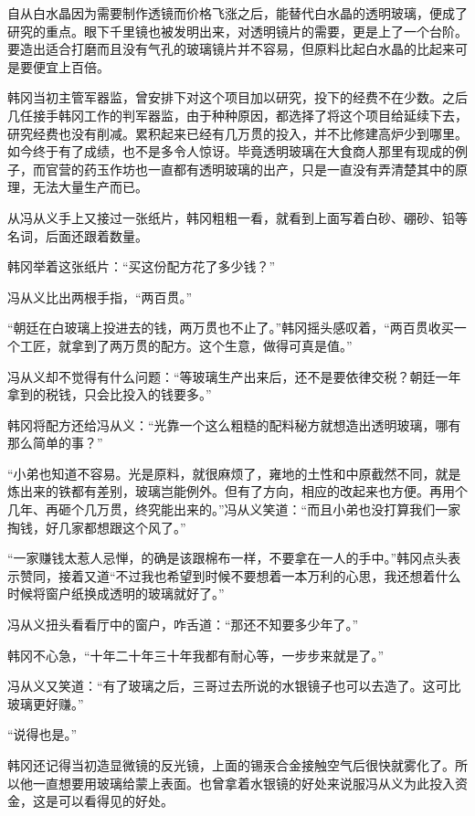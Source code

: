 自从白水晶因为需要制作透镜而价格飞涨之后，能替代白水晶的透明玻璃，便成了研究的重点。眼下千里镜也被发明出来，对透明镜片的需要，更是上了一个台阶。要造出适合打磨而且没有气孔的玻璃镜片并不容易，但原料比起白水晶的比起来可是要便宜上百倍。

韩冈当初主管军器监，曾安排下对这个项目加以研究，投下的经费不在少数。之后几任接手韩冈工作的判军器监，由于种种原因，都选择了将这个项目给延续下去，研究经费也没有削减。累积起来已经有几万贯的投入，并不比修建高炉少到哪里。如今终于有了成绩，也不是多令人惊讶。毕竟透明玻璃在大食商人那里有现成的例子，而官营的药玉作坊也一直都有透明玻璃的出产，只是一直没有弄清楚其中的原理，无法大量生产而已。

从冯从义手上又接过一张纸片，韩冈粗粗一看，就看到上面写着白砂、硼砂、铅等名词，后面还跟着数量。

韩冈举着这张纸片：“买这份配方花了多少钱？”

冯从义比出两根手指，“两百贯。”

“朝廷在白玻璃上投进去的钱，两万贯也不止了。”韩冈摇头感叹着，“两百贯收买一个工匠，就拿到了两万贯的配方。这个生意，做得可真是值。”

冯从义却不觉得有什么问题：“等玻璃生产出来后，还不是要依律交税？朝廷一年拿到的税钱，只会比投入的钱要多。”

韩冈将配方还给冯从义：“光靠一个这么粗糙的配料秘方就想造出透明玻璃，哪有那么简单的事？”

“小弟也知道不容易。光是原料，就很麻烦了，雍地的土性和中原截然不同，就是炼出来的铁都有差别，玻璃岂能例外。但有了方向，相应的改起来也方便。再用个几年、再砸个几万贯，终究能出来的。”冯从义笑道：“而且小弟也没打算我们一家掏钱，好几家都想跟这个风了。”

“一家赚钱太惹人忌惮，的确是该跟棉布一样，不要拿在一人的手中。”韩冈点头表示赞同，接着又道“不过我也希望到时候不要想着一本万利的心思，我还想着什么时候将窗户纸换成透明的玻璃就好了。”

冯从义扭头看看厅中的窗户，咋舌道：“那还不知要多少年了。”

韩冈不心急，“十年二十年三十年我都有耐心等，一步步来就是了。”

冯从义又笑道：“有了玻璃之后，三哥过去所说的水银镜子也可以去造了。这可比玻璃更好赚。”

“说得也是。”

韩冈还记得当初造显微镜的反光镜，上面的锡汞合金接触空气后很快就雾化了。所以他一直想要用玻璃给蒙上表面。也曾拿着水银镜的好处来说服冯从义为此投入资金，这是可以看得见的好处。

